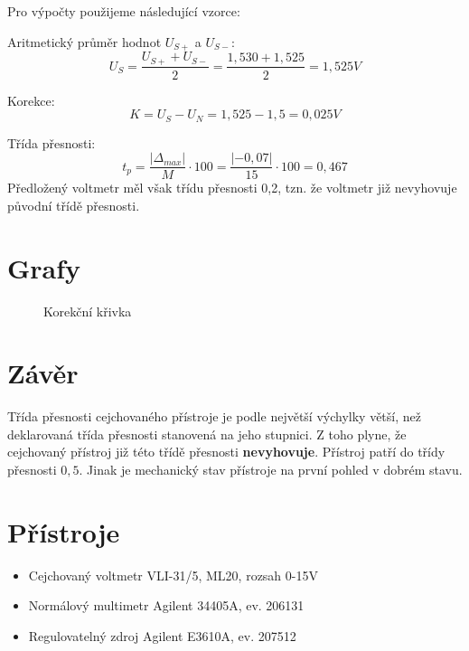 \documentclass[12pt]{article} %
\begin{document}
Pro výpočty použijeme následující vzorce:

Aritmetický průměr hodnot $U_{S+}$ a $U_{S-}$:
\begin{equation}
U_S = \frac{U_{S+}+U_{S-}}{2} = \frac{1,530+1,525}{2} = 1,525V
\end{equation}

Korekce:
\begin{equation}
K = U_S - U_N = 1,525-1,5 = 0,025V
\end{equation}

Třída přesnosti:
\begin{equation}
t_p = \frac{|\Delta _{max}|}{M}\cdot 100 = \frac{|-0,07|}{15}\cdot 100=0,467
\end{equation}
Předložený voltmetr měl však třídu přesnosti 0,2, tzn. že voltmetr již nevyhovuje původní třídě přesnosti.

\section{Grafy}
\begin{figure}[H]
\centering
	\caption{Korekční křivka}
\end{figure}

\section{Závěr}
Třída přesnosti cejchovaného přístroje je podle největší výchylky větší, než deklarovaná třída přesnosti stanovená na jeho stupnici. Z toho plyne, že cejchovaný přístroj již této třídě přesnosti \textbf{nevyhovuje}. Přístroj patří do třídy přesnosti $0,5$. Jinak je mechanický stav přístroje na první pohled v dobrém stavu.

\section{Přístroje}
\begin{itemize}
\item Cejchovaný voltmetr VLI-31/5, ML20, rozsah 0-15V
\item Normálový multimetr Agilent 34405A, ev. 206131
\item Regulovatelný zdroj Agilent E3610A, ev. 207512
\end{itemize}
\end{document}
